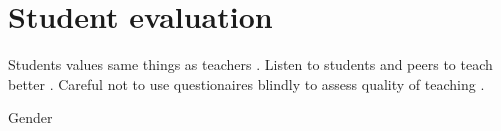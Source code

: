 \chapter{Student evaluation}\label{ap:student}

Students values same things as teachers \citep[chapter 6]{Ramsden1992}. Listen to students and peers to teach better \citep[chapter 7]{Ramsden1992}. Careful not to use questionaires blindly to assess quality of teaching \citep[chapter 11]{Ramsden1992}.

Gender \citep{Gonsalves2014,Gonsalves2014a}
